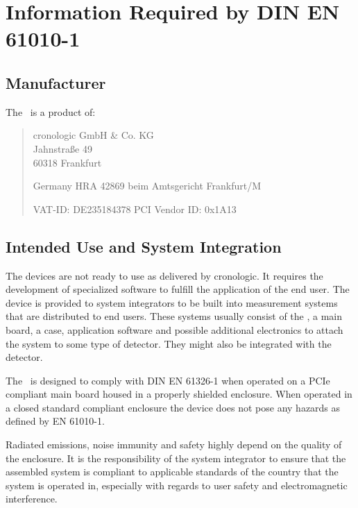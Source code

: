 \newpage
\section{Information Required by DIN EN 61010-1}
\subsection{Manufacturer\label{cp:manu}}

The \deviceName\ is a product of:\

\begin{quote}
	cronologic GmbH \& Co. KG\\
	Jahnstra\ss{}e 49\\
	60318 Frankfurt\par
	Germany
	\noindent HRA 42869 beim Amtsgericht Frankfurt/M\par
	\noindent VAT-ID: DE235184378
	\noindent PCI Vendor ID: 0x1A13
\end{quote}

\subsection{Intended Use and System Integration}

	The devices are not ready to use as delivered by cronologic. It requires the development of specialized software to fulfill the application of the end user. The device is provided to system integrators to be built into measurement systems that are distributed to end users. These systems usually consist of the \deviceName, a main board, a case, application software and possible additional electronics to attach the system to some type of detector. They might also be integrated with the detector.\par

	The \deviceName\ is designed to comply with DIN EN 61326-1 when operated on a PCIe compliant main board housed in a properly shielded enclosure. 
	When operated in a closed standard compliant enclosure the device does not pose any hazards as defined by EN 61010-1.\par

	Radiated emissions, noise immunity and safety highly depend on the quality of the enclosure. 
	It is the responsibility of the system integrator to ensure that the assembled system is compliant to applicable standards of the country that the system is operated in, especially with regards to user safety and electromagnetic interference. \par
	 
